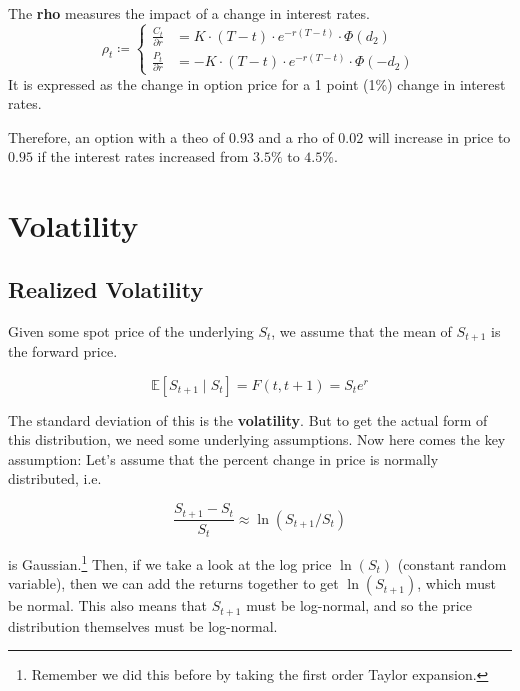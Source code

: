\documentclass{article}
\begin{document}
    \begin{definition}[Rho]
      The \textbf{rho} measures the impact of a change in interest rates. 
      \begin{equation}
        \rho_t \coloneqq \begin{cases} 
          \frac{C_t}{\partial r} & = K \cdot (T - t) \cdot e^{-r (T - t)} \cdot \Phi(d_2) \\ 
          \frac{P_t}{\partial r} & = -K \cdot (T - t) \cdot e^{-r (T - t)} \cdot \Phi(-d_2)
        \end{cases}
      \end{equation}
      It is expressed as the change in option price for a 1 point (1\%) change in interest rates.  
    \end{definition}

    Therefore, an option with a theo of $0.93$ and a rho of $0.02$ will increase in price to $0.95$ if the interest rates increased from $3.5\%$ to $4.5\%$.  

\section{Volatility}

  \subsection{Realized Volatility}

    Given some spot price of the underlying $S_t$, we assume that the mean of $S_{t + 1}$ is the forward price. 

    \begin{equation}
      \mathbb{E}[S_{t+1} \mid S_t] = F(t, t+1) = S_t e^{r} 
    \end{equation} 

    The standard deviation of this is the \textbf{volatility}. But to get the actual form of this distribution, we need some underlying assumptions. Now here comes the key assumption: Let's assume that the percent change in price is normally distributed, i.e. 

    \begin{equation}
      \frac{S_{t + 1} - S_t}{S_t} \approx \ln(S_{t + 1} / S_t) 
    \end{equation}

    is Gaussian.\footnote{Remember we did this before by taking the first order Taylor expansion.} Then, if we take a look at the log price $\ln(S_t)$ (constant random variable), then we can add the returns together to get $\ln(S_{t + 1})$, which must be normal. This also means that $S_{t+1}$ must be log-normal, and so the price distribution themselves must be log-normal. 
\end{document}

